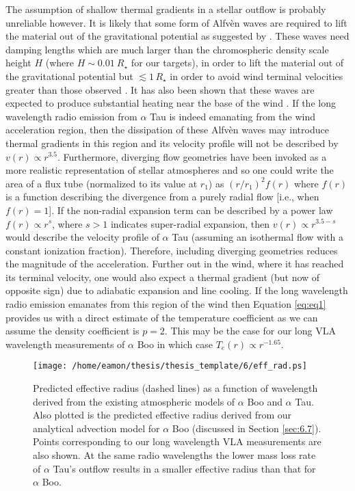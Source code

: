 The assumption of shallow thermal gradients in a stellar outflow is probably unreliable however. It is likely that some form of Alfv\`{e}n waves are required to lift the material out of the gravitational potential as suggested by \cite{hartmann_1980}. These waves need damping lengths which are much larger than the chromospheric density scale height $H$ (where $H \sim 0.01\ R_{\star}$ for our targets), in order to lift the material out of the gravitational potential but $\lesssim 1 \, R_{\star}$ in order to avoid wind terminal velocities greater than those observed \citep[e.g.][]{holzer_1983}. It has also been shown that these waves are expected to produce substantial heating near the base of the wind \citep[e.g.][]{hartmann_1982}. If the long wavelength radio emission from $\alpha$ Tau is indeed emanating from the wind acceleration region, then the dissipation of these Alfv\`{e}n waves may introduce thermal gradients in this region and its velocity profile will not be described by $v(r) \propto r^{3.5}$. Furthermore, diverging flow geometries have been invoked as a more realistic representation of stellar atmospheres \citep{hartmann_1982,jatenco_1989,vidotto_2006} and so one could write the area of a flux tube (normalized to its value at $r_{1}$) as $(r/r_{1})^2f(r)$ where $f(r)$ is a function describing the divergence from a purely radial flow [i.e., when $f(r)=1$].  If the non-radial expansion term can be described by a power law $f(r) \propto r^s$, where $s>1$ indicates super-radial expansion, then $v(r) \propto r^{3.5-s}$ would describe the velocity profile of $\alpha$ Tau (assuming an isothermal flow with a constant ionization fraction). Therefore, including diverging geometries reduces the magnitude of the acceleration. Further out in the wind, where it has reached its terminal velocity, one would also expect a thermal gradient (but now of opposite sign) due to adiabatic expansion and line cooling. If the long wavelength radio emission emanates from this region of the wind then Equation \ref{eq:eq1} provides us with a direct estimate of the temperature coefficient as we can assume the density coefficient is $p=2$. This may be the case for our long VLA wavelength measurements of $\alpha$ Boo in which case $T_{e}(r) \propto r^{-1.65}$.

\begin{figure}[hbt!]
\centering 
          \texttt{[image: /home/eamon/thesis/thesis\_template/6/eff\_rad.ps]}
\caption[Predicted effective radius as a function of wavelength for $\alpha$ Boo and $\alpha$ Tau.]{Predicted effective radius (dashed lines) as a function of wavelength derived from the existing atmospheric models of $\alpha$ Boo and $\alpha$ Tau.  Also plotted is the predicted effective radius derived from our analytical advection model for $\alpha$ Boo (discussed in Section \ref{sec:6.7}). Points corresponding to our long wavelength VLA measurements are also shown. At the same radio wavelengths the lower mass loss rate of $\alpha$ Tau's outflow results in a smaller effective radius than that for $\alpha$ Boo.}
\label{fig6.6.3}
\end{figure}

